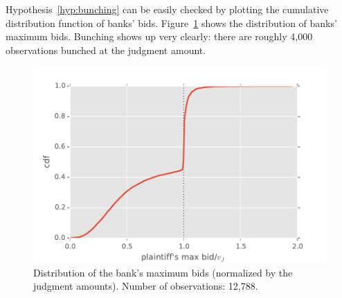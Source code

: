 \documentclass[11pt,twopage]{article}
\begin{document}
Hypothesis~\ref{hyp:bunching} can be easily checked by plotting the
cumulative distribution function of banks'
bids. Figure~\ref{fig:public-reserve} shows the distribution of banks'
maximum bids. Bunching shows up very clearly: there are roughly 4,000
observations bunched at the judgment amount.



\begin{figure}[htbp]
  \centering
  \includegraphics[width=0.6
  \textwidth]{graphics/distr-maxbid}%
  \caption{Distribution of the bank's maximum bids (normalized by the
    judgment amounts). Number of observations: 12,788.}
  \label{fig:public-reserve}
\end{figure}
\end{document}
